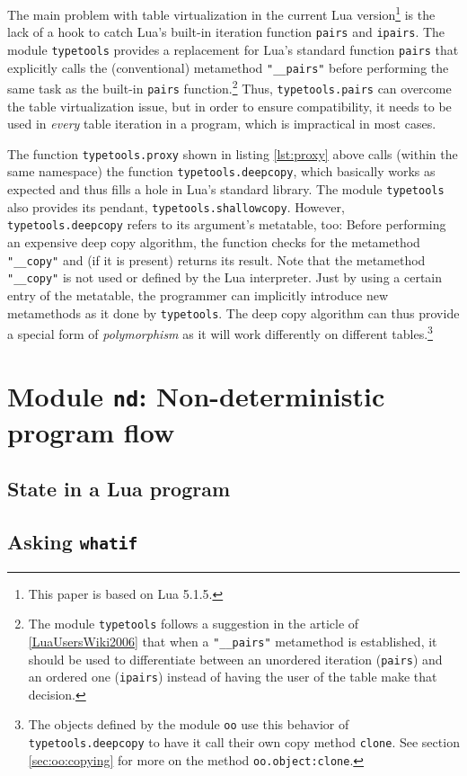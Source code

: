 The main problem with table virtualization in the current Lua version\footnote{This paper is based on Lua 5.1.5.} is the lack of a hook to catch Lua's built-in iteration function \texttt{pairs} and \texttt{ipairs}. The module \texttt{typetools} provides a replacement for Lua's standard function \texttt{pairs} that explicitly calls the (conventional) metamethod \texttt{"\_\_pairs"} before performing the same task as the built-in \texttt{pairs} function.\footnote{The module \texttt{typetools} follows a suggestion in the article  of \ref{LuaUsersWiki2006} that when a \texttt{"\_\_pairs"} metamethod is established, it should be used to differentiate between an unordered iteration (\texttt{pairs}) and an ordered one (\texttt{ipairs}) instead of having the user of the table make that decision.} Thus, \texttt{typetools.pairs} can overcome the table virtualization issue, but in order to ensure compatibility, it needs to be used in \emph{every} table iteration in a program, which is impractical in most cases.

The function \texttt{typetools.proxy} shown in listing \ref{lst:proxy} above calls (within the same namespace) the function \texttt{typetools.deepcopy}, which basically works as expected and thus fills a hole in Lua's standard library. The module \texttt{typetools} also provides its pendant, \texttt{typetools.shallowcopy}. However, \texttt{typetools.deepcopy} refers to its argument's metatable, too: Before performing an expensive deep copy algorithm, the function checks for the metamethod \texttt{"\_\_copy"} and (if it is present) returns its result. Note that the metamethod \texttt{"\_\_copy"} is not used or defined by the Lua interpreter. Just by using a certain entry of the metatable, the programmer can implicitly introduce new metamethods as it done by \texttt{typetools}. The deep copy algorithm can thus provide a special form of \emph{polymorphism} as it will work differently on different tables.\footnote{The objects defined by the module \texttt{oo} use this behavior of \texttt{typetools.deepcopy} to have it call their own copy method \texttt{clone}. See section \ref{sec:oo:copying} for more on the method \texttt{oo.object:clone}.}



\section{Module \texttt{nd}: Non-deterministic program flow}

\subsection{State in a Lua program}

\subsection{Asking \texttt{whatif}}
\label{sec:whatif}




